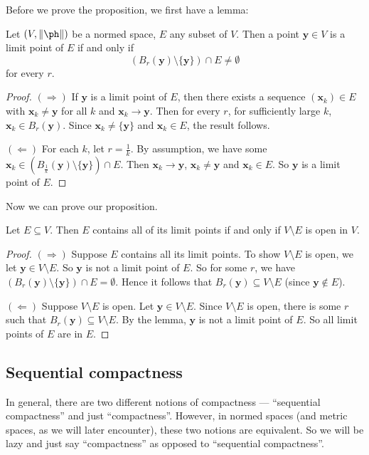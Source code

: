 \documentclass[a4paper]{article}
\begin{document}
Before we prove the proposition, we first have a lemma:

\begin{lemma}
  Let $(V, \|\ph\|)$ be a normed space, $E$ any subset of $V$. Then a point $\mathbf{y} \in V$ is a limit point of $E$ if and only if
  \[
    (B_r(\mathbf{y}) \setminus \{\mathbf{y}\}) \cap E \not= \emptyset
  \]
  for every $r$.
\end{lemma}

\begin{proof}
  $(\Rightarrow)$ If $\mathbf{y}$ is a limit point of $E$, then there exists a sequence $(\mathbf{x}_k) \in E$ with $\mathbf{x}_k \not= \mathbf{y}$ for all $k$ and $\mathbf{x}_k \to \mathbf{y}$. Then for every $r$, for sufficiently large $k$, $\mathbf{x}_k \in B_r(\mathbf{y})$. Since $\mathbf{x}_k \not= \{\mathbf{y}\}$ and $\mathbf{x}_k \in E$, the result follows.

  $(\Leftarrow)$ For each $k$, let $r = \frac{1}{k}$. By assumption, we have some $\mathbf{x}_k \in (B_{\frac{1}{k}}(\mathbf{y}) \setminus \{\mathbf{y}\}) \cap E$. Then $\mathbf{x}_k \to \mathbf{y}$, $\mathbf{x}_k \not= \mathbf{y}$ and $\mathbf{x}_k \in E$. So $\mathbf{y}$ is a limit point of $E$.
\end{proof}

Now we can prove our proposition.
\begin{prop}
  Let $E\subseteq V$. Then $E$ contains all of its limit points if and only if $V\setminus E$ is open in $V$.
\end{prop}

\begin{proof}
  $(\Rightarrow)$ Suppose $E$ contains all its limit points. To show $V\setminus E$ is open, we let $\mathbf{y} \in V\setminus E$. So $\mathbf{y}$ is not a limit point of $E$. So for some $r$, we have $(B_r(\mathbf{y})\setminus \{\mathbf{y}\}) \cap E = \emptyset$. Hence it follows that $B_r(\mathbf{y}) \subseteq V\setminus E$ (since $\mathbf{y} \not\in E$).

  $(\Leftarrow)$ Suppose $V\setminus E$ is open. Let $\mathbf{y} \in V\setminus E$. Since $V\setminus E$ is open, there is some $r$ such that $B_r(\mathbf{y}) \subseteq V\setminus E$. By the lemma, $\mathbf{y}$ is not a limit point of $E$. So all limit points of $E$ are in $E$.
\end{proof}

\subsection{Sequential compactness}
In general, there are two different notions of compactness --- ``sequential compactness'' and just ``compactness''. However, in normed spaces (and metric spaces, as we will later encounter), these two notions are equivalent. So we will be lazy and just say ``compactness'' as opposed to ``sequential compactness''.
\end{document}
